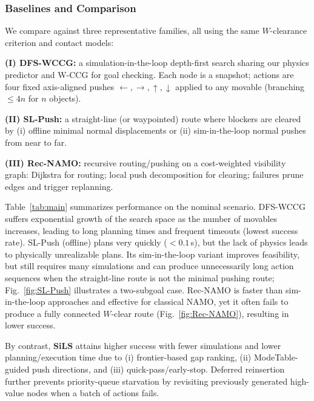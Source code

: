 \subsubsection{Baselines and Comparison}
\label{subsec:baselines}
We compare against three representative families, all using the same $W$-clearance criterion and contact models:

\textbf{(I) DFS-WCCG:} a simulation-in-the-loop depth-first search sharing our physics predictor and W-CCG for goal checking. Each node is a snapshot; actions are four fixed axis-aligned pushes ${\leftarrow,\rightarrow,\uparrow,\downarrow}$ applied to any movable (branching $\le 4n$ for $n$ objects).

\textbf{(II) SL-Push:} a straight-line (or waypointed) route where blockers are cleared by (i) offline minimal normal displacements or (ii) sim-in-the-loop normal pushes from near to far.

\textbf{(III) Rec-NAMO:} recursive routing/pushing on a cost-weighted visibility graph: Dijkstra for routing; local push decomposition for clearing; failures prune edges and trigger replanning.

Table~\ref{tab:main} summarizes performance on the nominal scenario. DFS-WCCG suffers exponential growth of the search space as the number of movables increases, leading to long planning times and frequent timeouts (lowest success rate). SL-Push (offline) plans very quickly ($<0.1$\,s), but the lack of physics leads to physically unrealizable plans. Its sim-in-the-loop variant improves feasibility, but still requires many simulations and can produce unnecessarily long action sequences when the straight-line route is not the minimal pushing route; Fig.~\ref{fig:SL-Push} illustrates a two-subgoal case. Rec-NAMO is faster than sim-in-the-loop approaches and effective for classical NAMO, yet it often fails to produce a fully connected $W$-clear route (Fig.~\ref{fig:Rec-NAMO}), resulting in lower success. 

By contrast, \textbf{SiLS} attains higher success with fewer simulations and lower planning/execution time due to (i) frontier-based gap ranking, (ii) ModeTable-guided push directions, and (iii) quick-pass/early-stop. Deferred reinsertion further prevents priority-queue starvation by revisiting previously generated high-value nodes when a batch of actions fails.

